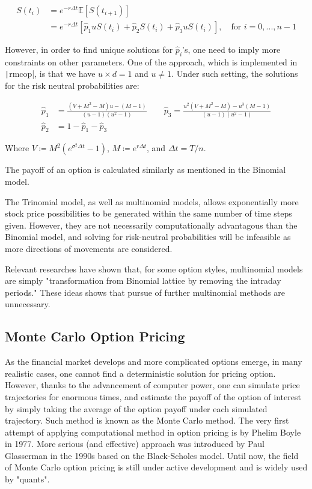 \begin{align}
	S(t_{i}) &= e^{-r\Delta t}\mathbb{E}[S(t_{i+1})] \\
	&= e^{-r\Delta t}[\hat{p}_1uS(t_i)+\hat{p}_2S(t_i)+\hat{p}_3uS(t_i)],\quad\text{for }i=0,...,n-1
\end{align}

However, in order to find unique solutions for $\hat{p}_i$'s, one need to imply more constraints on other parameters. One of the approach, which is implemented in \texttt|rmcop|, is that we have $u\times d=1$ and $u\neq1$. Under such setting, the solutions for the risk neutral probabilities are:


\begin{align}
\hat{p}_1&=\frac{(V + M^2 - M) u - (M - 1)}{(u - 1)(u^2 - 1)}\qquad\hat{p}_3=\frac{u^2(V + M^2 - M) - u^3(M - 1)}{(u - 1)(u^2 - 1)} \\
\hat{p}_2&=1-\hat{p}_1-\hat{p}_3
\end{align}

Where $V\coloneqq M^2(e^{\sigma^2\Delta t} - 1)$, $M\coloneqq e^{r\Delta t}$, and $\Delta t=T/n$.

The payoff of an option is calculated similarly as mentioned in the Binomial model.

The Trinomial model, as well as multinomial models, allows exponentially more stock price possibilities to be generated within the same number of time steps given. However, they are not necessarily computationally advantagous than the Binomial model, and solving for risk-neutral probabilities will be infeasible as more directions of movements are considered.

Relevant researches \cite{SI2019} have shown that, for some option styles, multinomial models are simply "transformation from Binomial lattice by removing the intraday periods." These ideas shows that pursue of further multinomial methods are unnecessary.

\subsection{Monte Carlo Option Pricing}

As the financial market develops and more complicated options emerge, in many realistic cases, one cannot find a deterministic solution for pricing option. However, thanks to the advancement of computer power, one can simulate price trajectories for enormous times, and estimate the payoff of the option of interest by simply taking the average of the option payoff under each simulated trajectory. Such method is known as the Monte Carlo method. The very first attempt of applying computational method in option pricing is by Phelim Boyle in 1977. More serious (and effective) approach was introduced by Paul Glasserman \cite{Glasserman2003} in the 1990s based on the Black-Scholes model. Until now, the field of Monte Carlo option pricing is still under active development and is widely used by "quants".

